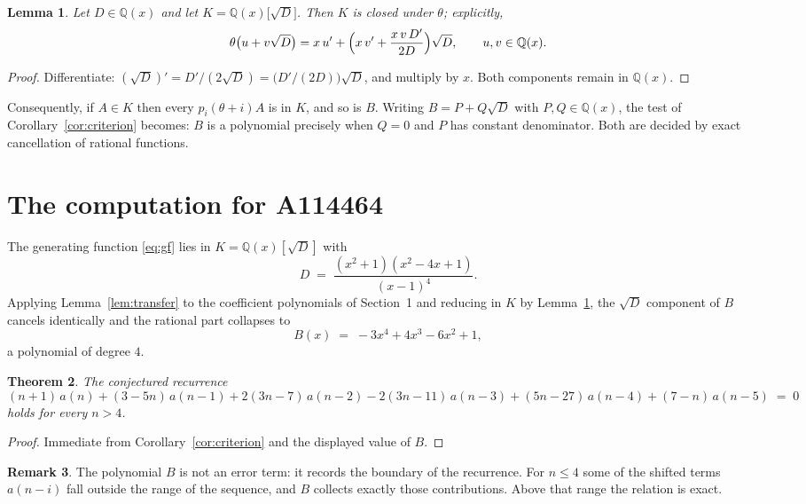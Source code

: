 \documentclass[11pt,a4paper]{article}
\theoremstyle{plain}
\newtheorem{theorem}{Theorem}
\newtheorem{lemma}[theorem]{Lemma}
\theoremstyle{definition}
\newtheorem{remark}[theorem]{Remark}
\begin{document}
\begin{lemma}\label{lem:field}
Let $D\in\mathbb{Q}(x)$ and let $K=\mathbb{Q}(x)\bigl[\sqrt{D}\bigr]$. Then $K$ is closed
under $\theta$; explicitly,
\[
\theta\bigl(u+v\sqrt{D}\bigr)=x\,u'+\Bigl(x\,v'+\frac{x\,v\,D'}{2D}\Bigr)\sqrt{D},
\qquad u,v\in\mathbb{Q}(x).
\]
\end{lemma}

\begin{proof}
Differentiate: $(\sqrt{D})'=D'/(2\sqrt{D})=\bigl(D'/(2D)\bigr)\sqrt{D}$, and multiply by
$x$. Both components remain in $\mathbb{Q}(x)$.
\end{proof}

Consequently, if $A\in K$ then every $p_{i}(\theta+i)A$ is in $K$, and so is $B$. Writing
$B=P+Q\sqrt{D}$ with $P,Q\in\mathbb{Q}(x)$, the test of Corollary~\ref{cor:criterion}
becomes: $B$ is a polynomial precisely when $Q=0$ and $P$ has constant denominator. Both
are decided by exact cancellation of rational functions.

\section{The computation for A114464}

The generating function \eqref{eq:gf} lies in $K=\mathbb{Q}(x)[\sqrt{D}]$ with
\[
D \;=\; \frac{\left(x^{2} + 1\right) \left(x^{2} - 4 x + 1\right)}{\left(x - 1\right)^{4}} .
\]
Applying Lemma~\ref{lem:transfer} to the coefficient polynomials of Section~1 and reducing
in $K$ by Lemma~\ref{lem:field}, the $\sqrt{D}$ component of $B$ cancels identically and
the rational part collapses to
\[
B(x)\;=\;- 3 x^{4} + 4 x^{3} - 6 x^{2} + 1 ,
\]
a polynomial of degree $4$.

\begin{theorem}
The conjectured recurrence
\[
(n + 1)\,a(n) + (3 - 5 n)\,a(n-1) + 2 \left(3 n - 7\right)\,a(n-2) -  2 \left(3 n - 11\right)\,a(n-3) + (5 n - 27)\,a(n-4) + (7 - n)\,a(n-5) \;=\;0
\]
holds for every $n>4$.
\end{theorem}

\begin{proof}
Immediate from Corollary~\ref{cor:criterion} and the displayed value of $B$.
\end{proof}

\begin{remark}
The polynomial $B$ is not an error term: it records the boundary of the recurrence. For
$n\le4$ some of the shifted terms $a(n-i)$ fall outside the range of the sequence,
and $B$ collects exactly those contributions. Above that range the relation is exact.
\end{remark}
\end{document}

